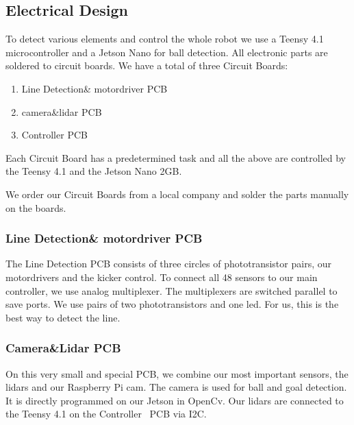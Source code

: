 \documentclass{scrartcl}
\begin{document}
\subsection{Electrical Design}
To detect various elements and control the whole robot we use a Teensy 4.1 microcontroller and a Jetson Nano
for ball detection. All electronic parts are soldered to circuit boards.
\newline
We have a total of three Circuit Boards:
\begin{enumerate}
    \item{Line Detection\& motordriver PCB}
    \item{camera\&lidar PCB}
    \item{Controller PCB}
\end{enumerate}
Each Circuit Board has a predetermined task and all the above are controlled by the Teensy 4.1
and the Jetson Nano 2GB.

We order our Circuit Boards from a local company and solder the parts manually on the boards.

\subsubsection{Line Detection\& motordriver PCB}


The Line Detection PCB consists of three circles of phototransistor pairs, our motordrivers and the kicker control. To connect all
48 sensors to our main controller, we use analog multiplexer. The multiplexers are switched parallel
to save ports.
\newline
We use pairs of two phototransistors and one led. For us, this is the
best way to detect the line.

\subsubsection*{Camera\&Lidar PCB}
On this very small and special PCB, we combine our most important sensors, the lidars and our Raspberry Pi
cam. The camera is used for ball and goal detection. It is directly programmed on our Jetson in OpenCv.
Our lidars are connected to the Teensy 4.1 on the Controller~\label{PCB:Controller} PCB via I2C.
\end{document}
